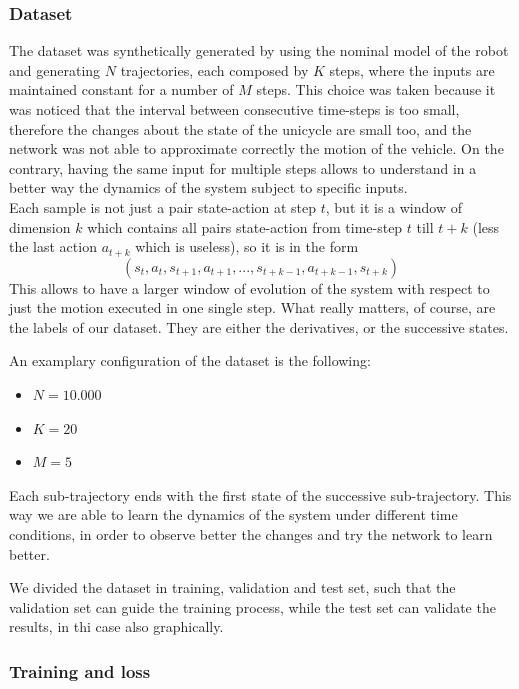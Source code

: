 \subsubsection{Dataset}
The dataset was synthetically generated by using the nominal model of the
robot and generating $N$ trajectories, each composed by $K$ steps, where
the inputs are maintained constant for a number of $M$ steps. This choice was
taken because it was noticed that the interval between consecutive
time-steps is too small, therefore the changes about the state of the
unicycle are small too, and the network was not able to approximate
correctly the motion of the vehicle. On the contrary, having the same input
for multiple steps allows to understand in a better way the dynamics of the
system subject to specific inputs. \\
Each sample is not just a pair state-action at step $t$, but it is a window
of dimension $k$ which contains all pairs state-action from time-step $t$
till $t+k$ (less the last action $a_{t+k}$ which is useless), so it is in
the form 
\begin{equation}
    (s_t, a_t, s_{t+1}, a_{t+1}, ..., s_{t+k-1}, a_{t+k-1}, s_{t+k})
\end{equation}
This allows to have a larger window of evolution of the system with respect
to just the motion executed in one single step. What really matters, of
course, are the labels of our dataset. They are either the derivatives, or
the successive states. 

An examplary configuration of the dataset is the following:
\begin{itemize}
    \item $N = 10.000$
    \item $K = 20$
    \item $M = 5$
\end{itemize}

Each sub-trajectory ends with the first state of the successive
sub-trajectory. This way we are able to learn the dynamics of the system
under different time conditions, in order to observe better the changes and
try the network to learn better.

We divided the dataset in training, validation and test set, such that the
validation set can guide the training process, while the test set can
validate the results, in thi case also graphically.


\subsubsection{Training and loss}

